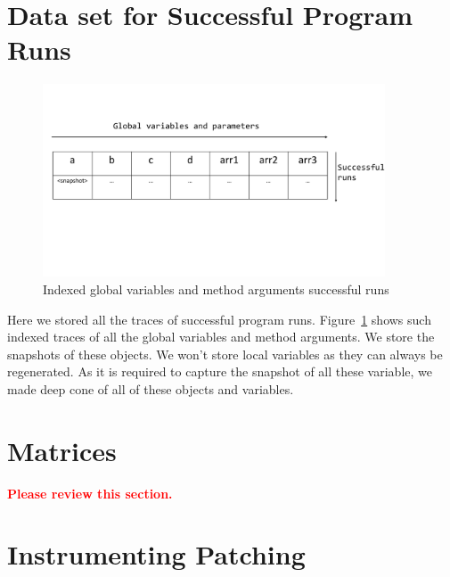 \section{Data set for Successful Program Runs}
\label{subsec:progrun}


\begin{figure}
\centering
\includegraphics[width=4.0in]{images/succrun.pdf}
\caption{Indexed global variables and method arguments successful runs}
\label{fig:succrun}
\end{figure}

Here we stored all the traces of successful program runs.
Figure~\ref{fig:succrun} shows such indexed traces of all the global variables and method arguments. 
We store the snapshots of these objects. We won't store local variables as they can always be regenerated. 
As it is required to capture the snapshot of all these variable, we made deep cone of all of these objects and variables. 



\section{Matrices}
\label{subsec:martices}

\textcolor{red}{\textbf{Please review this section.}}\newline

\section{Instrumenting Patching}
\label{subsec:patchinstru}


